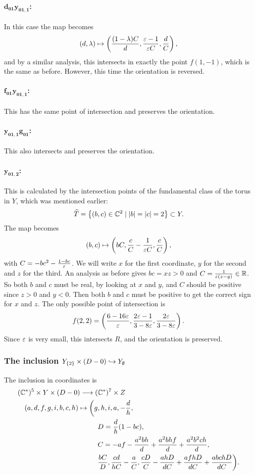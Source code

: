 \paragraph{$\mathbf{d_{01} y_{01,1}}$:}
In this case the map becomes
\[ (d,\lambda) \mapsto \left( \frac{(1-\lambda)C}{d},\frac{\varepsilon-1}{\varepsilon C},
  \frac{d}{C} \right), \]
and by a similar analysis, this intersects in exactly the
point $f(1,-1)$, which is the same as before. However, this time the
orientation is reversed.

\paragraph{$\mathbf{f_{01} y_{01,1}}$:}
This has the same point of intersection and preserves the orientation.

\paragraph{$\mathbf{y_{01,1}g_{01}}$:}
This also intersects and preserves the orientation.

\paragraph{$\mathbf{y_{01,2}}$:}
This is calculated by the intersection points of the fundamental class
of the torus in $Y$, which was mentioned earlier:
\[ \widehat T = \left\{ (b,c) \in \mathbb{C}^2 \mid \left| b \right|=\left| c \right| = 2 \right\}
\subset Y. \]
The map becomes
\[ (b,c) \mapsto \left( bC, \frac{c}{C}-\frac{1}{\varepsilon C},\frac{c}{C}
\right), \]
with $C = -bc^2-\frac{1-bc}{\varepsilon}$. We will write $x$ for the first
coordinate, $y$ for the second and $z$ for the third. An analysis as
before gives $bc = xz > 0$ and $C = \frac{1}{\varepsilon(z-y)} \in
\mathbb{R}$. So both $b$ and $c$ must be real, by looking at $x$ and $y$, and
$C$ should be positive since $z>0$ and $y<0$. Then
both $b$ and $c$ must be positive to get the correct sign for $x$ and
$z$. The only possible point of intersection is
\[ f(2,2) = \left( \frac{6-16\varepsilon}{\varepsilon},
  \frac{2\varepsilon-1}{3-8\varepsilon},\frac{2\varepsilon}{3-8\varepsilon} \right). \]
Since $\varepsilon$ is very small, this intersects $R$, and the orientation is
preserved.

\subsubsection{The inclusion $Y_{\left\{ 2 \right\}}\times (D-0) 
  \hookrightarrow Y_\emptyset$}

The inclusion in coordinates is
\begin{align*}
  (\mathbb{C}^*)^5\times Y \times (D-0) \longrightarrow (&\mathbb{C}^*)^7\times Z \\
  (a,d,f,g,i,b,c,h) \mapsto 
  \bigg(g&,h,i,a,-\frac{d}{h},\\
  & D=\frac{d}{h}(1-bc), \\
  & C= -af-\frac{a^2bh}{d}+\frac{a^2bhf}{d}+\frac{a^2b^2ch}{d}, \\
  & \frac{bC}{D}, \frac{cd}{hC}-\frac{a}{C},
  \frac{cD}{C}-\frac{ahD}{dC}+\frac{afhD}{dC}+
  \frac{abchD}{dC}\bigg).
\end{align*}

